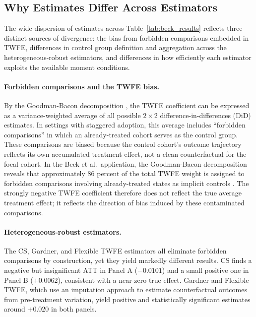 
\subsection{Why Estimates Differ Across Estimators}
\label{subsec:why_differ}

The wide dispersion of estimates across Table~\ref{tab:beck_results}
reflects three distinct sources of divergence: the bias from forbidden
comparisons embedded in TWFE, differences in control group definition and
aggregation across the heterogeneous-robust estimators, and differences
in how efficiently each estimator exploits the available moment conditions.

\paragraph{Forbidden comparisons and the TWFE bias.}
By the Goodman-Bacon decomposition \citep{goodman-bacon2021}, the TWFE
coefficient can be expressed as a variance-weighted average of all
possible $2\times 2$ difference-in-differences (DiD) estimates. In settings
with staggered adoption, this average includes ``forbidden comparisons''
in which an already-treated cohort serves as the control group. These
comparisons are biased because the control cohort's outcome trajectory
reflects its own accumulated treatment effect, not a clean counterfactual
for the focal cohort. In the Beck et al.\ application, the
Goodman-Bacon decomposition reveals that approximately 86 percent of the
total TWFE weight is assigned to forbidden comparisons involving
already-treated states as implicit controls \citep{arora2025}. The
strongly negative TWFE coefficient therefore does not reflect the true
average treatment effect; it reflects the direction of bias induced by
these contaminated comparisons.

\paragraph{Heterogeneous-robust estimators.}
The CS, Gardner, and Flexible TWFE estimators all eliminate forbidden
comparisons by construction, yet they yield markedly different results.
CS finds a negative but insignificant ATT in Panel A ($-0.0101$) and a
small positive one in Panel B ($+0.0062$), consistent with a near-zero
true effect. Gardner and Flexible TWFE, which use an imputation approach
to estimate counterfactual outcomes from pre-treatment variation, yield
positive and statistically significant estimates around $+0.020$ in both
panels.

